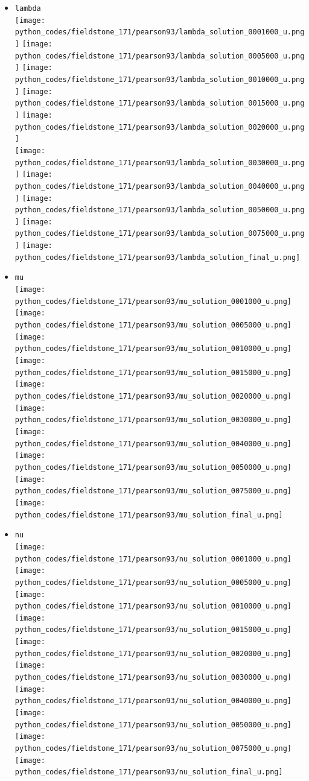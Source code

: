 \begin{itemize}
\item {\tt lambda}\\
\texttt{[image: python\_codes/fieldstone\_171/pearson93/lambda\_solution\_0001000\_u.png]}
\texttt{[image: python\_codes/fieldstone\_171/pearson93/lambda\_solution\_0005000\_u.png]}
\texttt{[image: python\_codes/fieldstone\_171/pearson93/lambda\_solution\_0010000\_u.png]}
\texttt{[image: python\_codes/fieldstone\_171/pearson93/lambda\_solution\_0015000\_u.png]}
\texttt{[image: python\_codes/fieldstone\_171/pearson93/lambda\_solution\_0020000\_u.png]}\\
\texttt{[image: python\_codes/fieldstone\_171/pearson93/lambda\_solution\_0030000\_u.png]}
\texttt{[image: python\_codes/fieldstone\_171/pearson93/lambda\_solution\_0040000\_u.png]}
\texttt{[image: python\_codes/fieldstone\_171/pearson93/lambda\_solution\_0050000\_u.png]}
\texttt{[image: python\_codes/fieldstone\_171/pearson93/lambda\_solution\_0075000\_u.png]}
\texttt{[image: python\_codes/fieldstone\_171/pearson93/lambda\_solution\_final\_u.png]}

\item {\tt mu}\\
\texttt{[image: python\_codes/fieldstone\_171/pearson93/mu\_solution\_0001000\_u.png]}
\texttt{[image: python\_codes/fieldstone\_171/pearson93/mu\_solution\_0005000\_u.png]}
\texttt{[image: python\_codes/fieldstone\_171/pearson93/mu\_solution\_0010000\_u.png]}
\texttt{[image: python\_codes/fieldstone\_171/pearson93/mu\_solution\_0015000\_u.png]}
\texttt{[image: python\_codes/fieldstone\_171/pearson93/mu\_solution\_0020000\_u.png]}\\
\texttt{[image: python\_codes/fieldstone\_171/pearson93/mu\_solution\_0030000\_u.png]}
\texttt{[image: python\_codes/fieldstone\_171/pearson93/mu\_solution\_0040000\_u.png]}
\texttt{[image: python\_codes/fieldstone\_171/pearson93/mu\_solution\_0050000\_u.png]}
\texttt{[image: python\_codes/fieldstone\_171/pearson93/mu\_solution\_0075000\_u.png]}
\texttt{[image: python\_codes/fieldstone\_171/pearson93/mu\_solution\_final\_u.png]}

\item {\tt nu}\\
\texttt{[image: python\_codes/fieldstone\_171/pearson93/nu\_solution\_0001000\_u.png]}
\texttt{[image: python\_codes/fieldstone\_171/pearson93/nu\_solution\_0005000\_u.png]}
\texttt{[image: python\_codes/fieldstone\_171/pearson93/nu\_solution\_0010000\_u.png]}
\texttt{[image: python\_codes/fieldstone\_171/pearson93/nu\_solution\_0015000\_u.png]}
\texttt{[image: python\_codes/fieldstone\_171/pearson93/nu\_solution\_0020000\_u.png]}\\
\texttt{[image: python\_codes/fieldstone\_171/pearson93/nu\_solution\_0030000\_u.png]}
\texttt{[image: python\_codes/fieldstone\_171/pearson93/nu\_solution\_0040000\_u.png]}
\texttt{[image: python\_codes/fieldstone\_171/pearson93/nu\_solution\_0050000\_u.png]}
\texttt{[image: python\_codes/fieldstone\_171/pearson93/nu\_solution\_0075000\_u.png]}
\texttt{[image: python\_codes/fieldstone\_171/pearson93/nu\_solution\_final\_u.png]}


\end{itemize}
